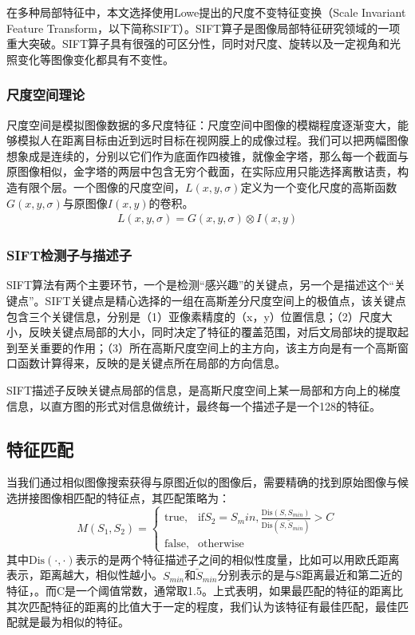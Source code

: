 \documentclass[UTF8]{csoarticle}
\begin{document}
在多种局部特征中，本文选择使用Lowe提出的尺度不变特征变换（Scale Invariant Feature Transform，以下简称SIFT）。SIFT算子是图像局部特征研究领域的一项重大突破。SIFT算子具有很强的可区分性，同时对尺度、旋转以及一定视角和光照变化等图像变化都具有不变性。

\subsubsection{尺度空间理论}
尺度空间是模拟图像数据的多尺度特征：尺度空间中图像的模糊程度逐渐变大，能够模拟人在距离目标由近到远时目标在视网膜上的成像过程。我们可以把两幅图像想象成是连续的，分别以它们作为底面作四棱锥，就像金字塔，那么每一个截面与原图像相似，金字塔的两层中包含无穷个截面，在实际应用只能选择离散诘责，构造有限个层。一个图像的尺度空间，\(L(x,y,\sigma)\)定义为一个变化尺度的高斯函数\(G(x,y,\sigma)\)与原图像\(I(x,y)\)的卷积。
\begin{align}
  L(x,y,\sigma) = G(x,y,\sigma) \otimes I(x,y)
\end{align}

\subsubsection{SIFT检测子与描述子}
SIFT算法有两个主要环节，一个是检测“感兴趣”的关键点，另一个是描述这个“关键点”。SIFT关键点是精心选择的一组在高斯差分尺度空间上的极值点，该关键点包含三个关键信息，分别是（1）亚像素精度的（x，y）位置信息；（2）尺度大小，反映关键点局部的大小，同时决定了特征的覆盖范围，对后文局部块的提取起到至关重要的作用；（3）所在高斯尺度空间上的主方向，该主方向是有一个高斯窗口函数计算得来，反映的是关键点所在局部的方向信息。

SIFT描述子反映关键点局部的信息，是高斯尺度空间上某一局部和方向上的梯度信息，以直方图的形式对信息做统计，最终每一个描述子是一个128的特征。

\subsection{特征匹配}
当我们通过相似图像搜索获得与原图近似的图像后，需要精确的找到原始图像与候选拼接图像相匹配的特征点，其匹配策略为：
\begin{equation}
  M(S_1,S_2) = 
\begin{cases} 
\text{true}, & \mbox{if} S_2 = S_min,\frac{\text{Dis}(S,S_{min})}{\text{Dis}(S,\tilde{S}_{min})} > C \\
\text{false}, & \mbox{otherwise}
\end{cases}
\end{equation}
其中\(\text{Dis}(\cdot,\cdot)\)表示的是两个特征描述子之间的相似性度量，比如可以用欧氏距离表示，距离越大，相似性越小。\(S_{min}\)和\(\tilde{S}_{min}\)分别表示的是与S距离最近和第二近的特征，。而C是一个阈值常数，通常取1.5。上式表明，如果最匹配的特征的距离比其次匹配特征的距离的比值大于一定的程度，我们认为该特征有最佳匹配，最佳匹配就是最为相似的特征。
\end{document}

